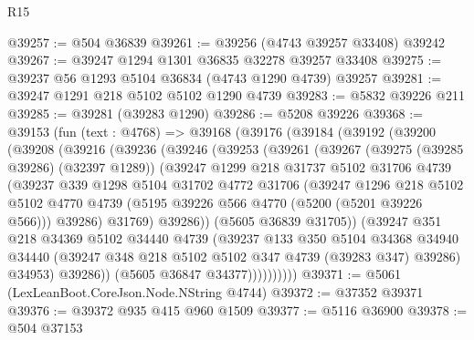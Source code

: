 \begin{lexlean}{R15}
\begin{coremodule}
{{{{{{{{{{{@39257 := @504 @36839
@39261 := @39256 (@4743 @39257 @33408) @39242
@39267 := @39247 @1294 @1301 @36835 @32278 @39257 @33408
@39275 := @39237 @56 @1293 @5104 @36834 (@4743 @1290 @4739) @39257
@39281 := @39247 @1291 @218 @5102 @5102 @1290 @4739
@39283 := @5832 @39226 @211
@39285 := @39281 (@39283 @1290)
@39286 := @5208 @39226
@39368 := @39153
    (fun (text : @4768) =>
    @39168
      (@39176
        (@39184
          (@39192
            (@39200
              (@39208
                (@39216
                  (@39236
                    (@39246
                      (@39253
                        (@39261
                          (@39267
                            (@39275 (@39285 @39286) (@32397 @1289))
                            (@39247
                              @1299
                              @218
                              @31737
                              @5102
                              @31706
                              @4739
                              (@39237
                                @339
                                @1298
                                @5104
                                @31702
                                @4772
                                @31706
                                (@39247
                                  @1296
                                  @218
                                  @5102
                                  @5102
                                  @4770
                                  @4739
                                  (@5195 @39226 @566 @4770 (@5200 (@5201 @39226 @566)))
                                  @39286)
                                @31769)
                              @39286))
                          (@5605 @36839 @31705))
                        (@39247
                          @351
                          @218
                          @34369
                          @5102
                          @34440
                          @4739
                          (@39237
                            @133
                            @350
                            @5104
                            @34368
                            @34940
                            @34440
                            (@39247 @348 @218 @5102 @5102 @347 @4739 (@39283 @347) @39286)
                            @34953)
                          @39286))
                      (@5605 @36847 @34377))))))))))
@39371 := @5061 (LexLeanBoot.CoreJson.Node.NString @4744)
@39372 := @37352 @39371
@39376 := @39372 @935 @415 @960 @1509
@39377 := @5116 @36900
@39378 := @504 @37153
}}}}}}}}}}}
\end{coremodule}
\end{lexlean}
